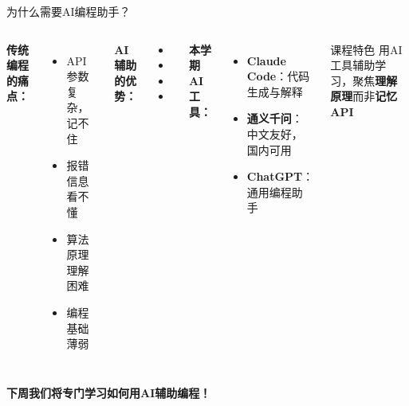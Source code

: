 \begin{frame}[fragile]{为什么需要AI编程助手？}
    \begin{columns}
        \textbf{传统编程的痛点：}
        \begin{itemize}
            \item API 参数复杂，记不住
            \item 报错信息看不懂
            \item 算法原理理解困难
            \item 编程基础薄弱
        \end{itemize}

        \vspace{0.3cm}
        \textbf{AI辅助的优势：}
        \begin{itemize}
            \item {}
            \item {}
            \item {}
            \item {}
        \end{itemize}

        \textbf{本学期AI工具：}
        \begin{itemize}
            \item \textbf{Claude Code}：代码生成与解释
            \item \textbf{通义千问}：中文友好，国内可用
            \item \textbf{ChatGPT}：通用编程助手
        \end{itemize}

        \vspace{0.3cm}
        \begin{block}{课程特色}
        用AI工具辅助学习，聚焦\textbf{理解原理}而非\textbf{记忆API}
        \end{block}
    \end{columns}

    \vspace{0.5cm}
    \begin{center}
        \textbf{下周我们将专门学习如何用AI辅助编程！}
    \end{center}
\end{frame}

